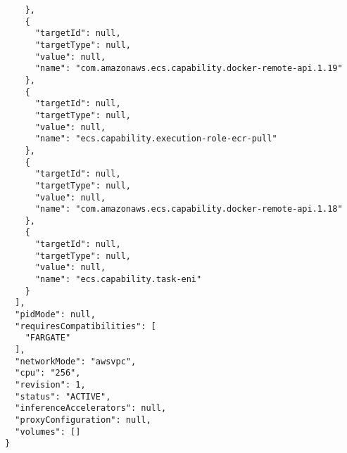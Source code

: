 \begin{verbatim}
    },
    {
      "targetId": null,
      "targetType": null,
      "value": null,
      "name": "com.amazonaws.ecs.capability.docker-remote-api.1.19"
    },
    {
      "targetId": null,
      "targetType": null,
      "value": null,
      "name": "ecs.capability.execution-role-ecr-pull"
    },
    {
      "targetId": null,
      "targetType": null,
      "value": null,
      "name": "com.amazonaws.ecs.capability.docker-remote-api.1.18"
    },
    {
      "targetId": null,
      "targetType": null,
      "value": null,
      "name": "ecs.capability.task-eni"
    }
  ],
  "pidMode": null,
  "requiresCompatibilities": [
    "FARGATE"
  ],
  "networkMode": "awsvpc",
  "cpu": "256",
  "revision": 1,
  "status": "ACTIVE",
  "inferenceAccelerators": null,
  "proxyConfiguration": null,
  "volumes": []
}
\end{verbatim}

